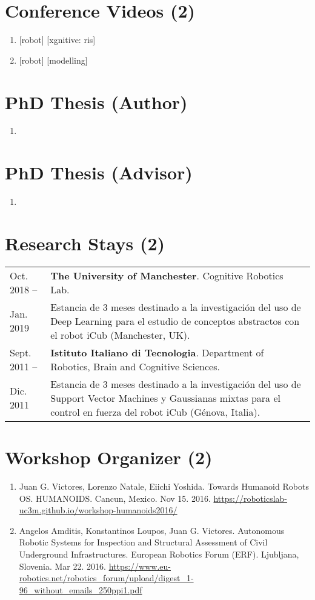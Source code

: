 \documentclass{article}
\begin{document}
\section*{Conference Videos (2)}
\begin{enumerate}
  \item {} [robot] [xgnitive: ris]
  \item {} [robot] [modelling]
\end{enumerate}

\section*{PhD Thesis (Author)}
\begin{enumerate}
  \item {}
\end{enumerate}

\section*{PhD Thesis (Advisor)}
\begin{enumerate}
  \item {}
\end{enumerate}

\section*{Research Stays (2)}
\begin{tabular}{l p{14cm}}
Oct. 2018 --&{\bf The University of Manchester}. Cognitive Robotics Lab.\\
Jan. 2019&Estancia de 3 meses destinado a la investigación del uso de Deep Learning para el estudio de conceptos abstractos con el robot iCub (Manchester, UK).\\
\rule{0pt}{4ex}
Sept. 2011 --&{\bf Istituto Italiano di Tecnologia}. Department of Robotics, Brain and Cognitive Sciences.\\
Dic. 2011&Estancia de 3 meses destinado a la investigación del uso de Support Vector Machines y Gaussianas mixtas para el control en fuerza del robot iCub (Génova, Italia).
\end{tabular}

\section*{Workshop Organizer (2)}
\begin{enumerate}
\item Juan G. Victores, Lorenzo Natale, Eiichi Yoshida. Towards Humanoid Robots OS. HUMANOIDS. Cancun, Mexico. Nov 15. 2016. \url{https://roboticslab-uc3m.github.io/workshop-humanoids2016/}
\item Angelos Amditis, Konstantinos Loupos, Juan G. Victores. Autonomous Robotic Systems for Inspection and Structural Assessment of Civil Underground Infrastructures. European Robotics Forum (ERF). Ljubljana, Slovenia. Mar 22. 2016. \url{https://www.eu-robotics.net/robotics\_forum/upload/digest\_1-96\_without\_emails\_250ppi1.pdf}
\end{enumerate}
\end{document}
